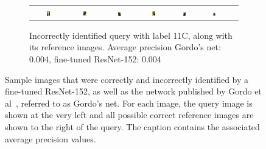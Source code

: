 \begin{figure}
\begin{subfigure}{\textwidth}
\begin{tabular}{|c|*{6}{c}}
\includegraphics[width=0.12\textwidth]{img/11C-0351.JPG} &
\includegraphics[width=0.12\textwidth]{img/11C-0.JPG} &
\includegraphics[width=0.12\textwidth]{img/11C-1.JPG} &
\includegraphics[width=0.12\textwidth]{img/11C-2.JPG} &
\includegraphics[width=0.12\textwidth]{img/11C-3.JPG} &
\includegraphics[width=0.12\textwidth]{img/11C-4.JPG} \\
\end{tabular}
\caption{Incorrectly identified query with label 11C,
along with its reference images.\newline
Average precision Gordo's net: 0.004, fine-tuned ResNet-152: 0.004
\label{fig:incorrect11C}}
\end{subfigure}
\caption{Sample images that were correctly and incorrectly identified
by a fine-tuned ResNet-152, as well as the network published by Gordo
et al~\cite{gordo_deep_2016}, referred to as Gordo's net. For each image,
the query image is shown at the very left and all possible correct reference
images are shown to the right of the query. The caption contains the
associated average precision values.
\label{fig:incorrectimg}}
\end{figure}

